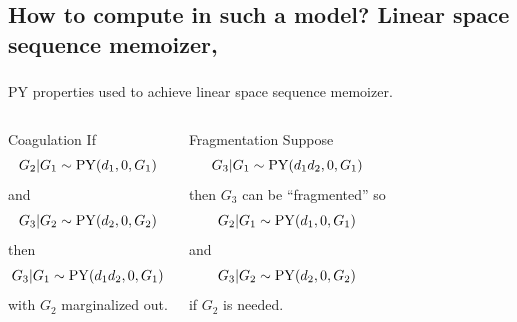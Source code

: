 \documentclass[16pt]{beamer}
\begin{document}
\subsection{How to compute in such a model? Linear space sequence memoizer, \citet{Wood2009}}
\begin{frame}[t] \frametitle{}
PY properties used to achieve linear space sequence memoizer.
\begin{columns}[c]  
\begin{block}{Coagulation \cite{Pitman1999, Ho2006}}
If \[G_2| G_1\sim\py(d_1,0,G_1)\] and \[G_3| G_2\sim\py(d_2,0,G_2)\] then
\[G_3|G_1\sim\py(d_1d_2,0,G_1)\] with $G_2$ marginalized out.
\label{thm:coag}
\end{block}
\begin{block}{Fragmentation \cite{Pitman1999, Ho2006,Wood2009}}
Suppose
 \[G_3| G_1\sim\py(d_1d_2,0,G_1)\]
 then $G_3$
 can be ``fragmented'' so 
 \[G_2 | G_1 \sim \py(d_1,0,G_1)\]
 and
  \[G_3| G_2\sim\py(d_2,0,G_2)\] 
  if $G_2$ is needed.
\end{block}
 \end{columns}
 \end{frame}
\end{document}
